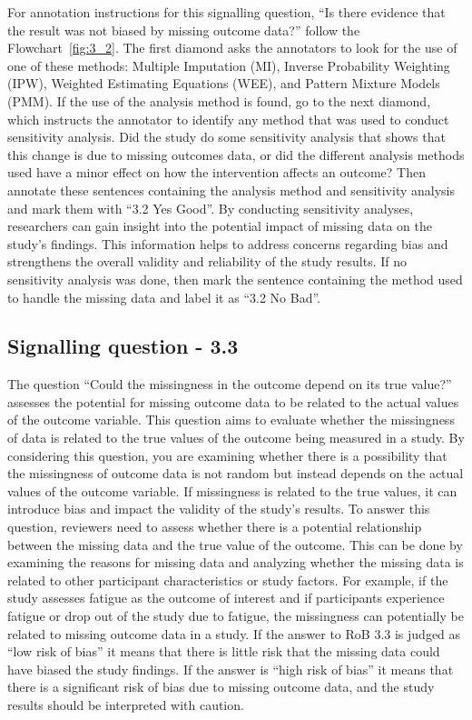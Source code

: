 \documentclass[sn-mathphys,Numbered]{sn-jnl}%
\begin{document}
For annotation instructions for this signalling question, ``Is there evidence that the result was not biased by missing outcome data?'' follow the Flowchart~\ref{fig:3_2}.
The first diamond asks the annotators to look for the use of one of these methods: Multiple Imputation (MI), Inverse Probability Weighting (IPW), Weighted Estimating Equations (WEE), and Pattern Mixture Models (PMM).
If the use of the analysis method is found, go to the next diamond, which instructs the annotator to identify any method that was used to conduct sensitivity analysis.
Did the study do some sensitivity analysis that shows that this change is due to missing outcomes data, or did the different analysis methods used have a minor effect on how the intervention affects an outcome?
Then annotate these sentences containing the analysis method and sensitivity analysis and mark them with ``3.2 Yes Good''.
By conducting sensitivity analyses, researchers can gain insight into the potential impact of missing data on the study's findings. This information helps to address concerns regarding bias and strengthens the overall validity and reliability of the study results.
If no sensitivity analysis was done, then mark the sentence containing the method used to handle the missing data and label it as ``3.2 No Bad''.
%
%
%
\subsection*{Signalling question - 3.3 }
%
The question ``Could the missingness in the outcome depend on its true value?'' assesses the potential for missing outcome data to be related to the actual values of the outcome variable.
This question aims to evaluate whether the missingness of data is related to the true values of the outcome being measured in a study.
By considering this question, you are examining whether there is a possibility that the missingness of outcome data is not random but instead depends on the actual values of the outcome variable.
If missingness is related to the true values, it can introduce bias and impact the validity of the study's results.
To answer this question, reviewers need to assess whether there is a potential relationship between the missing data and the true value of the outcome.
This can be done by examining the reasons for missing data and analyzing whether the missing data is related to other participant characteristics or study factors.
For example, if the study assesses fatigue as the outcome of interest and if participants experience fatigue or drop out of the study due to fatigue, the missingness can potentially be related to missing outcome data in a study.
If the answer to RoB 3.3 is judged as ``low risk of bias'' it means that there is little risk that the missing data could have biased the study findings.
If the answer is ``high risk of bias'' it means that there is a significant risk of bias due to missing outcome data, and the study results should be interpreted with caution.
\end{document}

